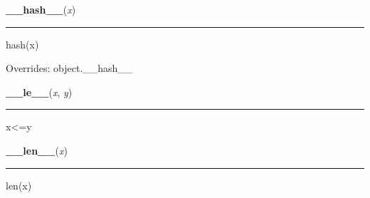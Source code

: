     \vspace{0.5ex}

\hspace{.8\funcindent}\begin{boxedminipage}{\funcwidth}

    \raggedright \textbf{\_\_hash\_\_}(\textit{x})

    \vspace{-1.5ex}

    \rule{\textwidth}{0.5\fboxrule}
\setlength{\parskip}{2ex}
    hash(x)

\setlength{\parskip}{1ex}
      Overrides: object.\_\_hash\_\_

    \end{boxedminipage}

    \label{time:struct_time:__le__}

    \vspace{0.5ex}

\hspace{.8\funcindent}\begin{boxedminipage}{\funcwidth}

    \raggedright \textbf{\_\_le\_\_}(\textit{x}, \textit{y})

    \vspace{-1.5ex}

    \rule{\textwidth}{0.5\fboxrule}
\setlength{\parskip}{2ex}
    x{\textless}=y

\setlength{\parskip}{1ex}
    \end{boxedminipage}

    \label{time:struct_time:__len__}

    \vspace{0.5ex}

\hspace{.8\funcindent}\begin{boxedminipage}{\funcwidth}

    \raggedright \textbf{\_\_len\_\_}(\textit{x})

    \vspace{-1.5ex}

    \rule{\textwidth}{0.5\fboxrule}
\setlength{\parskip}{2ex}
    len(x)

\setlength{\parskip}{1ex}
    \end{boxedminipage}

    \label{time:struct_time:__lt__}


